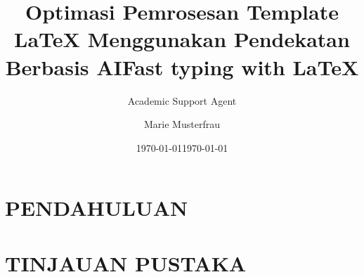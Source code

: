 \documentclass{article}
\title{Optimasi Pemrosesan Template LaTeX Menggunakan Pendekatan Berbasis AI}
\author{Academic Support Agent}
\date{\today}
\begin{document}
\maketitle

\begin{abstract}

\end{abstract}

\chapter{PENDAHULUAN}


\chapter{TINJAUAN PUSTAKA}


\usepackage[utf8]{inputenc}

\usepackage[ngerman,english]{babel}
\usepackage{fontawesome}
\usepackage{biblatex}

\usepackage{hyperref}
\usepackage{graphicx}

\usepackage{amsmath}
\usepackage{gensymb} %
\usepackage{csquotes}

\usepackage{tikz}

\usepackage{xcolor}


\usepackage{tcolorbox}


\newenvironment{mycolorbox}[2]{%
\begin{tcolorbox}[capture=minipage,fonttitle=\normalsize, enhanced jigsaw,boxsep=1mm,colback=#1!50!white,on line,tcbox width=auto, toptitle=0mm,colframe=#1,opacityback=0.7,nobeforeafter,title=#2]%
}{\end{tcolorbox}}



\title{Fast typing with LaTeX}
\author{Marie Musterfrau}
\date{\today}
\end{document}
